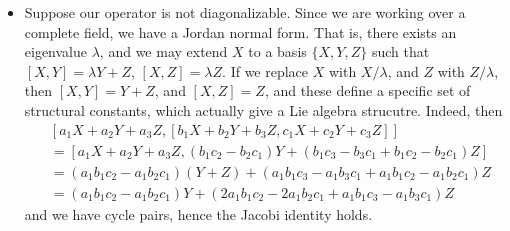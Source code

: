 \begin{itemize}
    \item Suppose our operator is not diagonalizable. Since we are working over a complete field, we have a Jordan normal form. That is, there exists an eigenvalue $\lambda$, and we may extend $X$ to a basis $\{ X,Y,Z \}$ such that $[X,Y] = \lambda Y + Z$, $[X,Z] = \lambda Z$. If we replace $X$ with $X/\lambda$, and $Z$ with $Z/\lambda$, then $[X,Y] = Y + Z$, and $[X,Z] = Z$, and these define a specific set of structural constants, which actually give a Lie algebra strucutre. Indeed, then
    \begin{align*}
        &[a_1X + a_2Y + a_3Z, [b_1X + b_2Y + b_3Z, c_1X + c_2Y + c_3Z]]\\
        &= [a_1X + a_2Y + a_3Z, (b_1c_2 - b_2c_1) Y + (b_1c_3 - b_3c_1 + b_1c_2 - b_2c_1) Z]\\
        &= (a_1b_1c_2 - a_1 b_2c_1) (Y + Z) + (a_1 b_1c_3 - a_1 b_3 c_1 + a_1b_1c_2 - a_1b_2c_1) Z\\
        &= (a_1b_1c_2 - a_1b_2c_1) Y + (2a_1b_1c_2 - 2a_1b_2c_1 + a_1b_1c_3 - a_1b_3c_1) Z
    \end{align*}
    and we have cycle pairs, hence the Jacobi identity holds.
\end{itemize}

